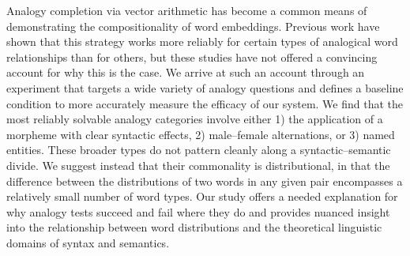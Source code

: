 Analogy completion via vector arithmetic has become a common means of demonstrating the compositionality of word embeddings. Previous work have shown that this strategy works more reliably for certain types of analogical word relationships than for others, but these studies have not offered a convincing account for why this is the case. We arrive at such an account through an experiment that targets a wide variety of analogy questions and defines a baseline condition to more accurately measure the efficacy of our system. We find that the most reliably solvable analogy categories involve either 1) the application of a morpheme with clear syntactic effects, 2) male--female alternations, or 3) named entities. These broader types do not pattern cleanly along a syntactic--semantic divide. We suggest instead that their commonality is distributional, in that the difference between the distributions of two words in any given pair encompasses a relatively small number of word types. Our study offers a needed explanation for why analogy tests succeed and fail where they do and provides nuanced insight into the relationship between word distributions and the theoretical linguistic domains of syntax and semantics.
